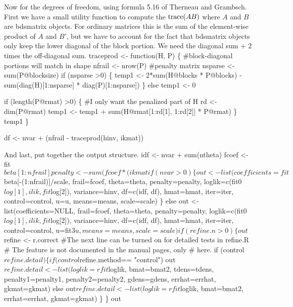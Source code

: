 \documentclass{article}
\begin{document}
Now for the degrees of freedom, using formula 5.16 of Therneau and Grambsch.
First we have a small utility function to compute the ${\rm trace}(AB)$ where
$A$ and $B$ are bdsmatrix objects.  
For ordinary matrices this is the sum of the element-wise product of $A$ and
$B'$, but we have to account for the fact that bdsmatrix objects only %
keep the lower diagonal of the block portion. 
We need the diagonal sum + 2 times the off-diagonal
sum.  
\nwenddocs{}\endmoddef
traceprod <- function(H, P) \{
    #block-diagonal portions will  match in shape
    nfrail <- nrow(P)  #penalty matrix
    nsparse <- sum(P@blocksize)
    if (nsparse >0) \{
        temp1 <- 2*sum(H@blocks * P@blocks) -
                 sum(diag(H)[1:nsparse] * diag(P)[1:nsparse])
        \}
    else temp1 <- 0
    
    if (length(P@rmat) >0) \{
        #I only want the penalized part of H
        rd <- dim(P@rmat)
        temp1 <- temp1 + sum(H@rmat[1:rd[1], 1:rd[2]] * P@rmat)
        \}
    temp1
    \}

df <- nvar + (nfrail - traceprod(hinv, ikmat))
\nwendcode{}\nwdocspar

And last, put together the output structure.
\nwenddocs{}\endmoddef
idf <- nvar + sum(ntheta)
fcoef <- fit$beta[1:nfrail]
penalty <- sum(fcoef * (ikmat %

if (nvar > 0) \{
    out <- list(coefficients = fit$beta[-(1:nfrail)]/scale, frail=fcoef, 
         theta=theta, penalty=penalty,
         loglik=c(fit0$log[1], ilik, fit$log[2]), variance=hinv,
         df=c(idf, df), hmat=hmat, iter=iter, control=control,
         u=u, means=means, scale=scale)
    \}
else out <- list(coefficients=NULL, frail=fcoef, 
                 theta=theta, penalty=penalty,
          loglik=c(fit0$log[1], ilik, fit$log[2]), variance=hinv,
          df=c(idf, df), hmat=hmat, iter=iter, control=control,
          u=fit3$u, means=means, scale=scale)    

if (refine.n>0) \{
    out$refine <- r.correct
    #The next line can be turned on for detailed tests in refine.R
    #  The feature is not documented in the manual pages, only
    #  here.
    if (control$refine.detail) \{
        if (control$refine.method== "control")
            out$refine.detail <-list(loglik=rfit$loglik, bmat=bmat2, 
                                     tdens=tdens,
                                     penalty1=penalty1, penalty2=penalty2,
                                     gdens=gdens, errhat=errhat, gkmat=gkmat)
        else out$refine.detail <- list(loglik=rfit$loglik, bmat=bmat2,
                                       errhat=errhat, gkmat=gkmat)
    \}
\}
out
\nwendcode{}\nwdocspar
\end{document}
